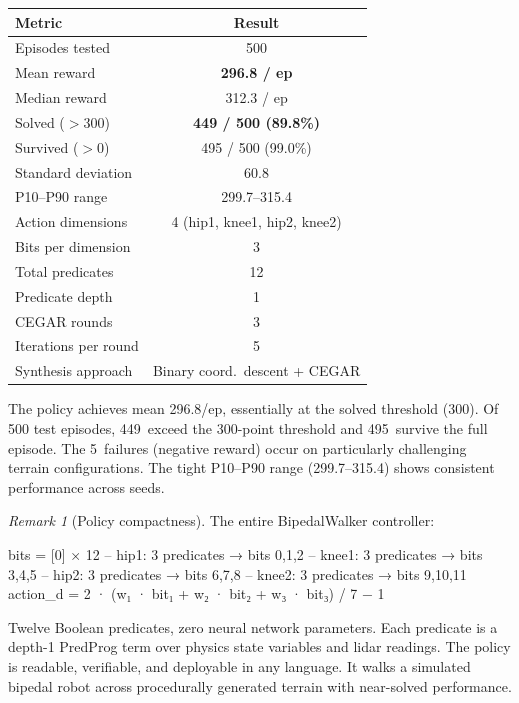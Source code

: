 \documentclass[9pt,a4paper]{article}
\theoremstyle{plain}
\theoremstyle{definition}
\theoremstyle{remark}
\newtheorem{remark}{Remark}
\begin{document}
\begin{center}
\begin{tabular}{lc}
\toprule
\textbf{Metric} & \textbf{Result} \\
\midrule
Episodes tested & 500 \\
Mean reward & \textbf{296.8 / ep} \\
Median reward & 312.3 / ep \\
Solved ($> 300$) & \textbf{449 / 500 (89.8\%)} \\
Survived ($> 0$) & 495 / 500 (99.0\%) \\
Standard deviation & 60.8 \\
P10--P90 range & 299.7--315.4 \\
\midrule
Action dimensions & 4 (hip1, knee1, hip2, knee2) \\
Bits per dimension & 3 \\
Total predicates & 12 \\
Predicate depth & 1 \\
CEGAR rounds & 3 \\
Iterations per round & 5 \\
Synthesis approach & Binary coord.\ descent + CEGAR \\
\bottomrule
\end{tabular}
\end{center}

The policy achieves mean 296.8/ep, essentially at the solved threshold
(300).  Of 500 test episodes, 449~exceed the 300-point threshold and
495~survive the full episode.  The 5~failures (negative reward) occur
on particularly challenging terrain configurations.  The tight P10--P90
range (299.7--315.4) shows consistent performance across seeds.

\begin{remark}[Policy compactness]
The entire BipedalWalker controller:
\begin{spec}
  bits = [0] × 12
  -- hip1:  3 predicates → bits 0,1,2
  -- knee1: 3 predicates → bits 3,4,5
  -- hip2:  3 predicates → bits 6,7,8
  -- knee2: 3 predicates → bits 9,10,11
  action_d = 2 · (w₁ · bit₁ + w₂ · bit₂ + w₃ · bit₃) / 7 − 1
\end{spec}
Twelve Boolean predicates, zero neural network parameters.
Each predicate is a depth-1 PredProg term over physics state
variables and lidar readings.  The policy is readable,
verifiable, and deployable in any language.  It walks a
simulated bipedal robot across procedurally generated terrain
with near-solved performance.
\end{remark}
\end{document}
